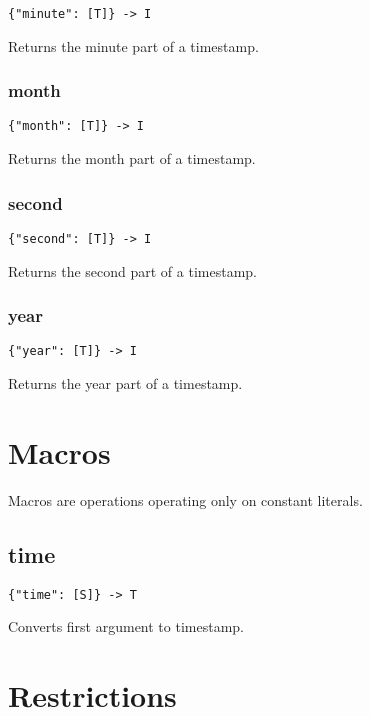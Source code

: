 \documentclass[a4paper]{article}
\begin{document}
\begin{verbatim}
{"minute": [T]} -> I
\end{verbatim}

Returns the minute part of a timestamp.

\subsubsection{month}

\begin{verbatim}
{"month": [T]} -> I
\end{verbatim}

Returns the month part of a timestamp.

\subsubsection{second}

\begin{verbatim}
{"second": [T]} -> I
\end{verbatim}

Returns the second part of a timestamp.

\subsubsection{year}

\begin{verbatim}
{"year": [T]} -> I
\end{verbatim}

Returns the year part of a timestamp.

\section{Macros}

Macros are operations operating only on constant literals.

\subsection{time}

\begin{verbatim}
{"time": [S]} -> T
\end{verbatim}

Converts first argument to timestamp. 

\section{Restrictions}
\end{document}
